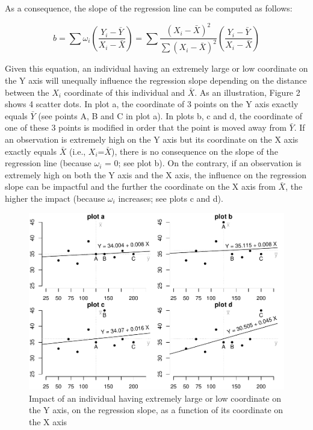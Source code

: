 \documentclass[man,floatsintext]{apa6}
\begin{document}
As a consequence, the slope of the regression line can be computed as follows:

\begin{equation} 
b=\sum\omega_i\left(\frac{Y_i-\bar{Y}}{ X_i-\bar{X}}\right)= \sum \frac{(X_i-\bar{X})^2}{\sum(X_i-\bar{X})^2} \left(\frac{Y_i-\bar{Y}}{X_i-\bar{X}}\right)
\label{eq:regressionslope}
\end{equation}

Given this equation, an individual having an extremely large or low coordinate on the Y axis will unequally influence the regression slope depending on the distance between the \(X_i\) coordinate of this individual and \(\bar{X}\). As an illustration, Figure 2 shows 4 scatter dots. In plot a, the coordinate of 3 points on the Y axis exactly equals \(\bar{Y}\) (see points A, B and C in plot a). In plots b, c and d, the coordinate of one of these 3 points is modified in order that the point is moved away from \(\bar{Y}\). If an observation is extremely high on the Y axis but its coordinate on the X axis exactly equals \(\bar{X}\) (i.e., \(X_i\)=\(\bar{X}\)), there is no consequence on the slope of the regression line (because \(\omega_i\) = 0; see plot b). On the contrary, if an observation is extremely high on both the Y axis and the X axis, the influence on the regression slope can be impactful and the further the coordinate on the X axis from \(\bar{X}\), the higher the impact (because \(\omega_i\) increases; see plots c and d).

\begin{figure}
\centering
\includegraphics{Outliers_files/figure-latex/outimpact-1.pdf}
\caption{\label{fig:outimpact}Impact of an individual having extremely large or low coordinate on the Y axis, on the regression slope, as a function of its coordinate on the X axis}
\end{figure}
\end{document}
